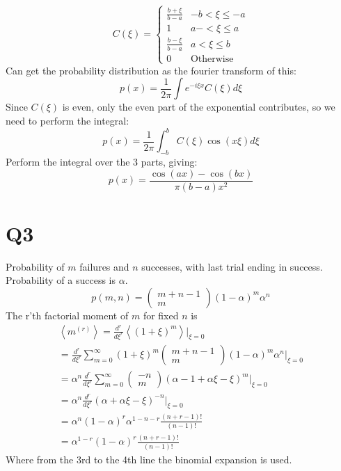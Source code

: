 \documentclass[../main.tex]{subfiles}
\begin{document}
\begin{equation}
	C(\xi) = 
	\begin{cases}
		\frac{b+\xi}{b-a} & -b<\xi\leq-a \\
		1 & a-<\xi\leq a\\
		\frac{b-\xi}{b-a} & a<\xi\leq b \\
		0 & \text{Otherwise}
	\end{cases}
\end{equation}
Can get the probability distribution as the fourier transform of this:
\begin{equation}
	p(x) = \frac{1}{2\pi}\int e^{-i\xi x}C(\xi)d\xi
\end{equation}
Since $C(\xi)$ is even, only the even part of the exponential contributes, so we need to perform the integral:
\begin{equation}
	p(x) = \frac{1}{2\pi}\int_{-b}^b C(\xi)\cos(x\xi)d\xi
\end{equation}
Perform the integral over the 3 parts, giving:
\begin{equation}
	p(x) = \frac{\cos(ax)-\cos(bx)}{\pi(b-a)x^2}
\end{equation}
\section*{Q3}
Probability of $m$ failures and $n$ successes, with last trial ending in success. Probability of a success is $\alpha$.
\begin{equation}
	p(m, n) = \left(\begin{matrix}m+n-1\\m\end{matrix}\right)(1-\alpha)^m\alpha^n
\end{equation}
The r'th factorial moment of $m$ for fixed $n$ is
\begin{align*}
	\left<m^{(r)}\right>=\frac{d^r}{d\xi^r}\left<(1+\xi)^m\right>\Big |_{\xi=0} \\
			    =\frac{d^r}{d\xi^r}\sum_{m=0}^\infty (1+\xi)^m \left(\begin{matrix}m+n-1\\m\end{matrix}\right)(1-\alpha)^m\alpha^n\Big|_{\xi=0} \\
			    =\alpha^n\frac{d^r}{d\xi^r}\sum_{m=0}^\infty\left(\begin{matrix}-n\\m\end{matrix}\right)(\alpha-1+\alpha\xi-\xi)^m\Big|_{\xi=0} \\
			    =\alpha^n \frac{d^r}{d\xi^r}(\alpha+\alpha\xi-\xi)^{-n}\Big|_{\xi=0} \\
			    =\alpha^n (1-\alpha)^r\alpha^{1-n-r}\frac{(n+r-1)!}{(n-1)!} \\
			    =\alpha^{1-r}(1-\alpha)^r\frac{(n+r-1)!}{(n-1)!}
\end{align*}
Where from the 3rd to the 4th line the binomial expansion is used.
\end{document}
